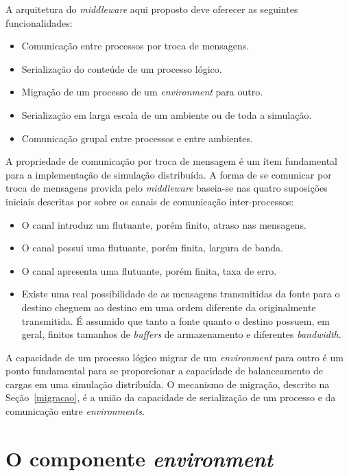 A arquitetura do \textit{middleware} aqui proposto deve oferecer as seguintes funcionalidades:
 
\begin{itemize}
\item Comunicação entre processos por troca de mensagens.
\item Serialização do conteúde de um processo lógico.
\item Migração de um processo de um \textit{environment} para outro.
\item Serialização em larga escala de um ambiente ou de toda a simulação.
\item Comunicação grupal entre processos e entre ambientes.
\end{itemize}

A propriedade de comunicação por troca de mensagem é um ítem fundamental para a implementação de simulação distribuída. A forma de se comunicar por troca de mensagens provida pelo \textit{middleware} baseia-se nas quatro suposições iniciais descritas por \cite{MCQUILLAN75} sobre os canais de comunicação inter-processos:

\begin{itemize}
\item O canal introduz um flutuante, porém finito, atraso nas mensagens.
\item O canal possui uma flutuante, porém finita, largura de banda.
\item O canal apresenta uma flutuante, porém finita, taxa de erro.
\item Existe uma real possibilidade de as mensagens transmitidas da fonte para o destino cheguem ao destino em uma ordem diferente da originalmente transmitida. É assumido que tanto a fonte quanto o destino possuem, em geral, finitos tamanhos de \textit{buffers} de armazenamento e diferentes \textit{bandwidth}.
\end{itemize}

A capacidade de um processo lógico migrar de um \textit{environment} para outro é um ponto fundamental para se proporcionar a capacidade de balanceamento de cargas em uma simulação distribuída. O mecanismo de migração, descrito na Seção~\ref{migracao}, é a união da capacidade de serialização de um processo e da comunicação entre \textit{environments}.

\section{O componente \textit{environment}}

